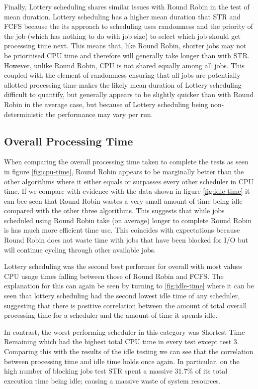 \documentclass{acm_proc_article-sp}
\begin{document}
Finally, Lottery scheduling shares similar issues with Round Robin in the test of mean duration. Lottery scheduling has a higher mean duration that STR and FCFS because the its approach to scheduling uses randomness and the priority of the job (which has nothing to do with job size) to select which job should get processing time next. This means that, like Round Robin, shorter jobs may not be prioritised CPU time and therefore will generally take longer than with STR. However, unlike Round Robin, CPU is not shared equally among all jobs. This coupled with the element of randomness ensuring that all jobs are potentially allotted processing time makes the likely mean duration of Lottery scheduling difficult to quantify, but generally appears to be slightly quicker than with Round Robin in the average case, but because of Lottery scheduling being non-deterministic the performance may vary per run.

\subsection{Overall Processing Time}
When comparing the overall processing time taken to complete the tests as seen in figure \ref{fig:cpu-time}, Round Robin appears to be marginally better than the other algorithms where it either equals or surpasses every other scheduler in CPU time. If we compare with evidence with the data shown in figure \ref{fig:idle-time} it can bee seen that Round Robin wastes a very small amount of time being idle compared with the other three algorithms. This suggests that while jobs scheduled using Round Robin take (on average) longer to complete Round Robin is has much more efficient time use. This coincides with expectations because Round Robin does not waste time with jobs that have been blocked for I/O but will continue cycling through other available jobs.

Lottery scheduling was the second best performer for overall with most values CPU usage times falling between those of Round Robin and FCFS. The explanation for this can again be seen by turning to \ref{fig:idle-time} where it can be seen that lottery scheduling had the second lowest idle time of any scheduler, suggesting that there is positive correlation between the amount of total overall processing time for a scheduler and the amount of time it spends idle.

In contrast, the worst performing scheduler in this category was Shortest Time Remaining which had the highest total CPU time in every test except test 3. Comparing this with the results of the idle testing we can see that the correlation between processing time and idle time holds once again. In particular, on the high number of blocking jobs test STR spent a massive 31.7\% of its total execution time being idle; causing a massive waste of system resources.
\end{document}
